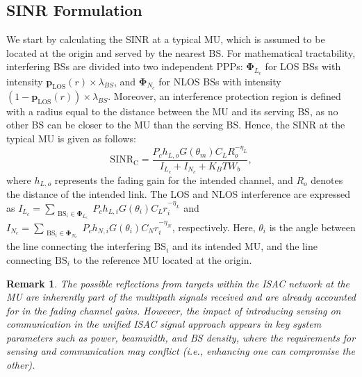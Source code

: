 \documentclass[journal]{IEEEtran}
\newtheorem{remark}{\textbf{Remark}}
\begin{document}

\subsection{SINR Formulation}

We start by calculating the SINR at a typical MU, which is assumed to be located at the origin and served by the nearest BS.
For mathematical tractability, interfering BSs are divided into two independent PPPs: 
\(\boldsymbol{\Phi}_{L_c}\) for LOS BSs with intensity \(\boldsymbol{p}_{\text{LOS}}(r) \times \lambda_{BS}\), 
and \(\boldsymbol{\Phi}_{N_c}\) for NLOS BSs with intensity \((1 - \boldsymbol{p}_{\text{LOS}}(r)) \times \lambda_{BS}\). Moreover,
an interference protection region is defined with a radius equal to the distance between the MU and its serving BS, 
as no other BS can be closer to the MU than the serving BS.
 Hence, the SINR at the typical MU is given as follows:
\begin{equation}\label{sinr_comm}
 \mathrm{SINR_C}=\frac{P_c h_{L,o} G(\theta_m) C_L R_o^{-\eta_L}}{I_{L_c}+I_{N_c}+K_B T W_b}, 
\end{equation}
where \( h_{L,o} \) represents the fading gain for the intended channel, and \( R_o \) denotes the distance of the intended link. 
The LOS and NLOS interference are expressed as 
\( I_{L_c} = \sum\limits_{\substack{\text{BS}_i \in \boldsymbol{\Phi}_{L_c}}} P_c h_{L,i} G(\theta_i) C_L r_i^{-\eta_L} \) 
and 
\( I_{N_c} = \sum\limits_{\substack{\text{BS}_i \in \boldsymbol{\Phi}_{N_c}}} P_c h_{N,i} G(\theta_i) C_N r_i^{-\eta_N} \), 
respectively. Here, \( \theta_i \) is the angle between the line connecting the interfering \( \text{BS}_i \) and its intended MU, 
and the line connecting \( \text{BS}_i \) to the reference MU located at the origin.

\begin{remark}
The possible reflections from targets within the ISAC network at the MU are inherently part of the multipath signals received and are already accounted for in the fading channel gains. 
However, the impact of introducing sensing on communication in the unified ISAC signal approach appears in key system parameters such as power, beamwidth, and BS density, where the requirements for sensing and communication may conflict (i.e., enhancing one can compromise the other).
\end{remark}
\end{document}
